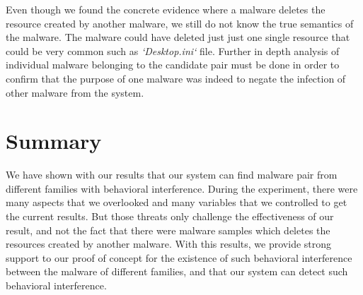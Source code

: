 Even though we found the concrete evidence where a malware deletes the resource created by another malware, we still do not know the true semantics of the malware.
The malware could have deleted just just one single resource that could be very common such as \emph{`Desktop.ini`} file.
Further in depth analysis of individual malware belonging to the candidate pair must be done in order to confirm that the purpose of one malware was indeed to negate the infection of other malware from the system.
\section{Summary}
\label{sec:Summary}

We have shown with our results that our system can find malware pair from different families with behavioral interference.
During the experiment, there were  many aspects that we overlooked and many variables that we controlled to get the current results.
But those threats only challenge the effectiveness of our result, and not the fact that there were malware samples which deletes the resources created by another malware.
With this results, we provide strong support to our proof of concept for the existence of such behavioral interference between the malware of different families, and that our system can detect such behavioral interference.

